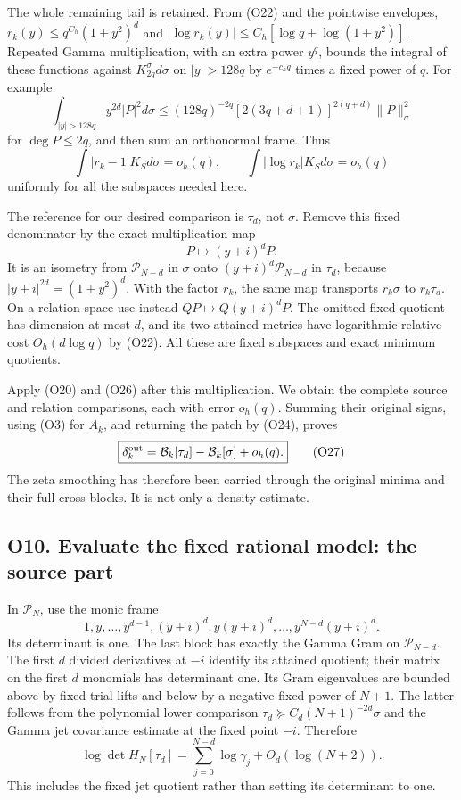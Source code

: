 The whole remaining tail is retained. From (O22) and the pointwise
envelopes, \(r_k(y)\le q^{C_h}(1+y^2)^d\) and
\(|\log r_k(y)|\le C_h[\log q+\log(1+y^2)]\). Repeated Gamma
multiplication, with an extra power \(y^q\), bounds the integral of
these functions against \(K_{2q}^\sigma d\sigma\) on \(|y|>128q\) by
\(e^{-c_hq}\) times a fixed power of \(q\). For example \[
\int_{|y|>128q}y^{2d}|P|^2d\sigma
\le(128q)^{-2q}[2(3q+d+1)]^{2(q+d)}\|P\|_\sigma^2
\] for \(\deg P\le2q\), and then sum an orthonormal frame. Thus \[
\boxed{\int|r_k-1|K_Sd\sigma=o_h(q),\qquad
\int|\log r_k|K_Sd\sigma=o_h(q)}\tag{O26}
\] uniformly for all the subspaces needed here.

The reference for our desired comparison is \(\tau_d\), not \(\sigma\).
Remove this fixed denominator by the exact multiplication map \[
P\longmapsto(y+i)^dP.
\] It is an isometry from \(\mathcal P_{N-d}\) in \(\sigma\) onto
\((y+i)^d\mathcal P_{N-d}\) in \(\tau_d\), because
\(|y+i|^{2d}=(1+y^2)^d\). With the factor \(r_k\), the same map
transports \(r_k\sigma\) to \(r_k\tau_d\). On a relation space use
instead \(QP\mapsto Q(y+i)^dP\). The omitted fixed quotient has
dimension at most \(d\), and its two attained metrics have logarithmic
relative cost \(O_h(d\log q)\) by (O22). All these are fixed subspaces
and exact minimum quotients.

Apply (O20) and (O26) after this multiplication. We obtain the complete
source and relation comparisons, each with error \(o_h(q)\). Summing
their original signs, using (O3) for \(A_k\), and returning the patch by
(O24), proves \[
\boxed{\delta_k^{\rm out}
=\mathcal B_k[\tau_d]-\mathcal B_k[\sigma]+o_h(q).}\tag{O27}
\] The zeta smoothing has therefore been carried through the original
minima and their full cross blocks. It is not only a density estimate.

\subsection{O10. Evaluate the fixed rational model: the source
part}\label{sa:o10.-evaluate-the-fixed-rational-model-the-source-part}

In \(\mathcal P_N\), use the monic frame \[
1,y,\ldots,y^{d-1},(y+i)^d,y(y+i)^d,\ldots,y^{N-d}(y+i)^d.
\] Its determinant is one. The last block has exactly the Gamma Gram on
\(\mathcal P_{N-d}\). The first \(d\) divided derivatives at \(-i\)
identify its attained quotient; their matrix on the first \(d\)
monomials has determinant one. Its Gram eigenvalues are bounded above by
fixed trial lifts and below by a negative fixed power of \(N+1\). The
latter follows from the polynomial lower comparison
\(\tau_d\succeq C_d(N+1)^{-2d}\sigma\) and the Gamma jet covariance
estimate at the fixed point \(-i\). Therefore \[
\log\det H_N[\tau_d]
=\sum_{j=0}^{N-d}\log\gamma_j+O_d(\log(N+2)).\tag{O28}
\] This includes the fixed jet quotient rather than setting its
determinant to one.

